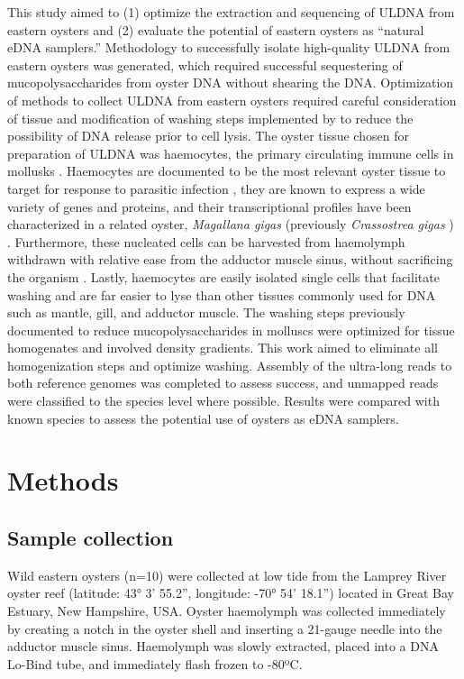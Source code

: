 \documentclass[lineno,referee,pdflatex,sn-basic]{sn-jnl}%
\begin{document}
This study aimed to (1) optimize the extraction and sequencing of ULDNA from eastern oysters and (2) evaluate the potential of eastern oysters as “natural eDNA samplers.” Methodology to successfully isolate high-quality ULDNA from eastern oysters was generated, which required successful sequestering of mucopolysaccharides from oyster DNA without shearing the DNA. Optimization of methods to collect ULDNA from eastern oysters required careful consideration of tissue and modification of washing steps implemented by \cite{brown_population_1989} to reduce the possibility of DNA release prior to cell lysis. The oyster tissue chosen for preparation of ULDNA was haemocytes, the primary circulating immune cells in mollusks \cite{anderson_defense_1995, estrada_vitro_2021}. Haemocytes are documented to be the most relevant oyster tissue to target for response to parasitic infection \cite{anderson_defense_1995, beaven_acidification_1999}, they are known to express a wide variety of genes and proteins, and their transcriptional profiles have been characterized in a related oyster, \textit{Magallana gigas} (previously \textit{Crassostrea gigas} \cite{salvi_molecular_2017}) \cite{estrada_vitro_2021, gueguen_oyster_2009, jin_molecular_2021}. Furthermore, these nucleated cells can be harvested from haemolymph withdrawn with relative ease from the adductor muscle sinus, without sacrificing the organism \cite{anderson_increased_1992}. Lastly, haemocytes are easily isolated single cells that facilitate washing and are far easier to lyse than other tissues commonly used for DNA such as mantle, gill, and adductor muscle.  The washing steps previously documented to reduce mucopolysaccharides in molluscs \cite{brown_population_1989} were optimized for tissue homogenates and involved density gradients. This work aimed to eliminate all homogenization steps and optimize washing. Assembly of the ultra-long reads to both reference genomes was completed to assess success, and unmapped reads were classified to the species level where possible. Results were compared with known species to assess the potential use of oysters as eDNA samplers.

\section{Methods}
\subsection{Sample collection}
Wild eastern oysters (n=10) were collected at low tide from the Lamprey River oyster reef (latitude: 43° 3’ 55.2”, longitude: -70° 54’ 18.1”) located in Great Bay Estuary, New Hampshire, USA. Oyster haemolymph was collected immediately by creating a notch in the oyster shell and inserting a 21-gauge needle into the adductor muscle sinus. Haemolymph was slowly extracted, placed into a DNA Lo-Bind tube, and immediately flash frozen to -80ºC.
\end{document}
